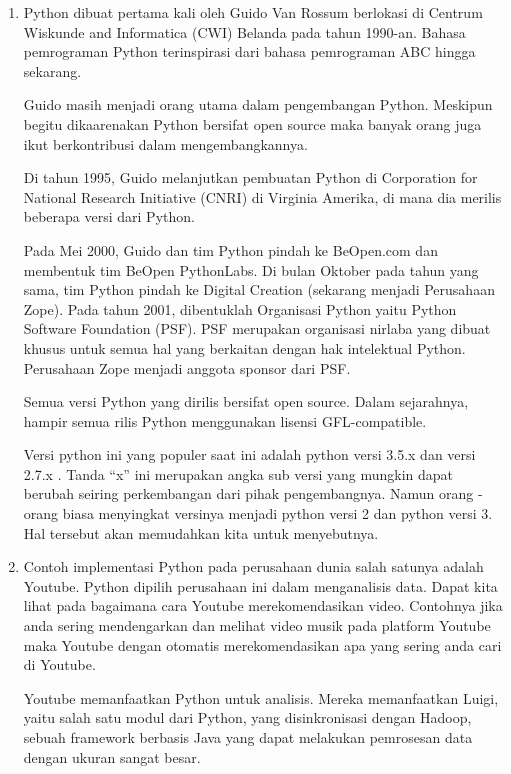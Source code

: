 \begin{enumerate}
    \item Python dibuat pertama kali oleh Guido Van Rossum berlokasi di  Centrum Wiskunde and Informatica (CWI) Belanda pada tahun 1990-an. Bahasa pemrograman Python terinspirasi dari bahasa pemrograman ABC hingga sekarang.
    \par
    Guido masih menjadi orang utama dalam pengembangan Python. Meskipun begitu dikaarenakan Python bersifat open source maka banyak orang juga ikut berkontribusi dalam mengembangkannya.
    \par
    Di tahun 1995, Guido melanjutkan pembuatan Python di Corporation for National Research Initiative (CNRI) di Virginia Amerika, di mana dia merilis beberapa versi dari Python.
    \par
    Pada Mei 2000, Guido dan tim Python pindah ke BeOpen.com dan membentuk tim BeOpen PythonLabs. Di bulan Oktober pada tahun yang sama, tim Python pindah ke Digital Creation (sekarang menjadi Perusahaan Zope). Pada tahun 2001, dibentuklah Organisasi Python yaitu Python Software Foundation (PSF). PSF merupakan organisasi nirlaba yang dibuat khusus untuk semua hal yang berkaitan dengan hak intelektual Python. Perusahaan Zope menjadi anggota sponsor dari PSF.
    \par
    Semua versi Python yang dirilis bersifat open source. Dalam sejarahnya, hampir semua rilis Python menggunakan lisensi GFL-compatible.
    \par
    Versi python ini yang populer saat ini adalah python versi 3.5.x dan versi 2.7.x . Tanda “x” ini merupakan angka sub versi yang mungkin dapat berubah seiring perkembangan dari pihak pengembangnya. Namun orang - orang biasa menyingkat versinya menjadi python versi 2 dan python versi 3. Hal tersebut akan memudahkan kita untuk menyebutnya.
    \par
    \item Contoh implementasi Python pada perusahaan dunia salah satunya adalah Youtube. Python dipilih perusahaan ini dalam menganalisis data. Dapat kita lihat pada bagaimana cara Youtube merekomendasikan video. Contohnya jika anda sering mendengarkan dan melihat video musik pada platform Youtube maka Youtube dengan otomatis merekomendasikan apa yang sering anda cari di Youtube.
    \par
    Youtube memanfaatkan Python untuk analisis. Mereka memanfaatkan Luigi, yaitu salah satu modul dari Python, yang disinkronisasi dengan Hadoop, sebuah framework berbasis Java yang dapat melakukan pemrosesan data dengan ukuran sangat besar.
\end{enumerate}

